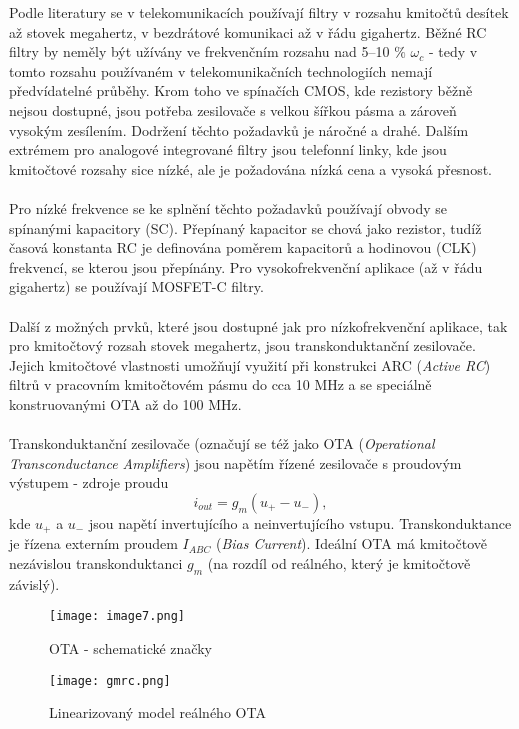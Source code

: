 Podle literatury \cite{16} se v telekomunikacích používají filtry v rozsahu kmitočtů desítek až stovek megahertz, v bezdrátové komunikaci až v řádu gigahertz. Běžné RC filtry by neměly být užívány ve frekvenčním rozsahu nad 5--10 $\%$ $\omega _c$ - tedy v tomto rozsahu používaném v telekomunikačních technologiích nemají předvídatelné průběhy. Krom toho ve spínačích CMOS, kde rezistory běžně nejsou dostupné, jsou potřeba zesilovače s velkou šířkou pásma a zároveň vysokým zesílením. Dodržení těchto požadavků je náročné a drahé. Dalším extrémem pro analogové integrované filtry jsou telefonní linky, kde jsou kmitočtové rozsahy sice nízké, ale je požadována nízká cena a vysoká přesnost.\\
\\
Pro nízké frekvence se ke splnění těchto požadavků používají obvody se spínanými kapacitory (SC). Přepínaný kapacitor se chová jako rezistor, tudíž časová konstanta RC je definována poměrem kapacitorů a hodinovou (CLK) frekvencí, se kterou jsou přepínány. Pro vysokofrekvenční aplikace (až v řádu gigahertz) se používají MOSFET-C filtry.\\
\\
Další z možných prvků, které jsou dostupné jak pro nízkofrekvenční aplikace, tak pro kmitočtový rozsah stovek megahertz, jsou transkonduktanční zesilovače. Jejich kmitočtové vlastnosti umožňují využití při konstrukci ARC (\textit{Active RC}) filtrů v pracovním kmitočtovém pásmu do cca 10 MHz a se speciálně konstruovanými OTA až do 100 MHz.\\
\\
Transkonduktanční zesilovače (označují se též jako OTA (\textit{Operational Transconductance Amplifiers}) jsou napětím řízené zesilovače s proudovým výstupem - zdroje proudu
\begin{equation}
i_{out} = g_m(u_+ - u_-),
\end{equation}
kde $u_+$ a $u_-$ jsou napětí invertujícího a neinvertujícího vstupu.  Transkonduktance je řízena externím proudem $I_{ABC}$ (\textit{Bias Current}). Ideální OTA má kmitočtově nezávislou transkonduktanci $g_m$ (na rozdíl od reálného, který je kmitočtově závislý).
\begin{figure}[h]
\centering
\texttt{[image: image7.png]}
\caption[OTA - schematické značky]{OTA - schematické značky \cite{8}}
\end{figure}
\begin{figure}[h]
\centering
\texttt{[image: gmrc.png]}
\caption[Linearizovaný model reálného OTA]{Linearizovaný model reálného OTA \cite{9}}
\end{figure}
